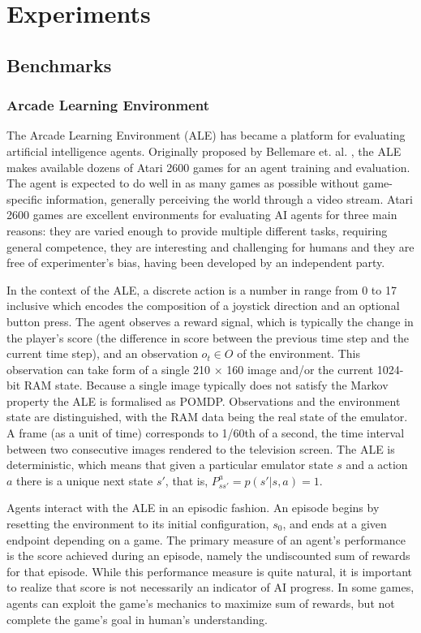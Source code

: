 \section{Experiments}

\subsection{Benchmarks}

\subsubsection{Arcade Learning Environment}

The Arcade Learning Environment (ALE) has became a platform for evaluating artificial intelligence agents. Originally proposed by Bellemare et. al. \cite{Code.ALE}, the ALE makes available dozens of Atari 2600 games for an agent training and evaluation. The agent is expected to do well in as many games as possible without game-specific information, generally perceiving the world through a video stream. Atari 2600 games are excellent environments for evaluating AI agents for three main reasons: they are varied enough to provide multiple different tasks, requiring general competence, they are interesting and challenging for humans and they are free of experimenter’s bias, having been developed by an independent party.

In the context of the ALE, a discrete action is a number in range from 0 to 17 inclusive which encodes the composition of a joystick direction and an optional button press. The agent observes a reward signal, which is typically the change in the player’s score (the difference in score between the previous time step and the current time step), and an observation $o_t \in O$ of the environment. This observation can take form of a single 210 × 160 image and/or the current 1024-bit RAM state. Because a single image typically does not satisfy the Markov property the ALE is formalised as POMDP. Observations and the environment state are distinguished, with the RAM data being the real state of the emulator. A frame (as a unit of time) corresponds to 1/60th of a second, the time interval between two consecutive images rendered to the television screen. The ALE is deterministic, which means that given a particular emulator state $s$ and a action $a$ there is a unique next state $s'$, that is, $P^a_{ss'} = p(s' | s, a) = 1$.

Agents interact with the ALE in an episodic fashion. An episode begins by resetting the environment to its initial configuration, $s_0$, and ends at a given endpoint depending on a game. The primary measure of an agent’s performance is the score achieved during an episode, namely the undiscounted sum of rewards for that episode. While this performance measure is quite natural, it is important to realize that score is not necessarily an indicator of AI progress. In some games, agents can exploit the game's mechanics to maximize sum of rewards, but not complete the game's goal in human's understanding. \cite{Study.FaultyReward}

